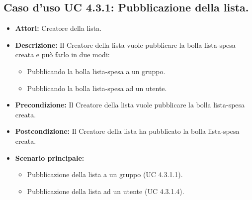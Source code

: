 \subsection{Caso d'uso UC 4.3.1: Pubblicazione della lista.}
\label{Caso d'uso UC 4.3.1: Pubblicazione della lista.}

\FloatBarrier
\begin{itemize}
\item \textbf{Attori:} Creatore della lista.
\item \textbf{Descrizione:} Il Creatore della lista vuole pubblicare la bolla lista-spesa creata e può farlo in due modi:
\begin{itemize}
\item Pubblicando la bolla lista-spesa a un gruppo.
\item Pubblicando la bolla lista-spesa ad un utente.
\end{itemize}
\item \textbf{Precondizione:} Il Creatore della lista vuole pubblicare la bolla lista-spesa creata. 
\item \textbf{Postcondizione:} Il Creatore della lista ha pubblicato la bolla lista-spesa creata.
\item \textbf{Scenario principale:}
	\begin{itemize}
	\item{Pubblicazione della lista a un gruppo (UC 4.3.1.1).}
	\item{Pubblicazione della lista ad un utente (UC 4.3.1.4).}
	\end{itemize}
\end{itemize}
